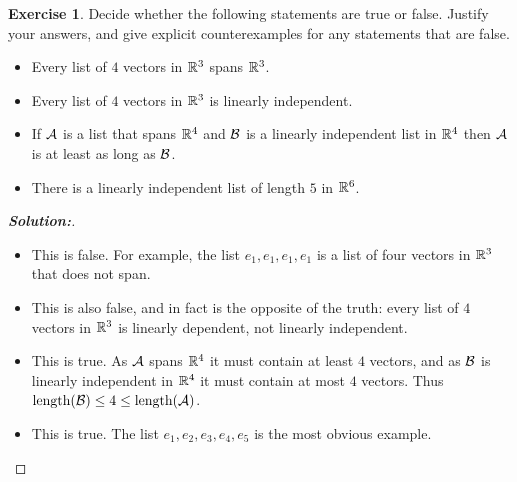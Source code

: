 \documentclass[a4paper]{amsart}
\theoremstyle{definition}
\newtheorem{exercise}{Exercise}
\newenvironment{solution}{\begin{proof}[\textbf{Solution:}] \vphantom{u}}{\end{proof}}
\begin{document}
\begin{exercise}\label{ex-independent-iv}
 Decide whether the following statements are true or false.  Justify
 your answers, and give explicit counterexamples for any statements
 that are false.
 \begin{itemize}
  \item[(a)] Every list of $4$ vectors in ${\mathbb{R}}^3$ spans ${\mathbb{R}}^3$.
  \item[(b)] Every list of $4$ vectors in ${\mathbb{R}}^3$ is linearly
   independent.
  \item[(c)] If $\mathcal{A}$ is a list that spans ${\mathbb{R}}^4$ and $\mathcal{B}$ is a
   linearly independent list in ${\mathbb{R}}^4$ then $\mathcal{A}$ is at least as long
   as $\mathcal{B}$.
  \item[(d)] There is a linearly independent list of length $5$ in
   ${\mathbb{R}}^6$. 
 \end{itemize}
\end{exercise}
\begin{solution}
 \begin{itemize}
  \item[(a)] This is false.  For example, the list $e_1,e_1,e_1,e_1$
   is a list of four vectors in ${\mathbb{R}}^3$ that does not span.
  \item[(b)] This is also false, and in fact is the opposite of the
   truth: every list of $4$ vectors in ${\mathbb{R}}^3$ is linearly dependent,
   not linearly independent.
  \item[(c)] This is true.  As $\mathcal{A}$ spans ${\mathbb{R}}^4$ it must contain at
   least $4$ vectors, and as $\mathcal{B}$ is linearly independent in ${\mathbb{R}}^4$
   it must contain at most $4$ vectors. 
   Thus $\text{length}(\mathcal{B})\leq 4\leq\text{length}(\mathcal{A})$.
  \item[(d)] This is true.  The list $e_1,e_2,e_3,e_4,e_5$ is the most
   obvious example.
 \end{itemize}
\end{solution}
\end{document}
